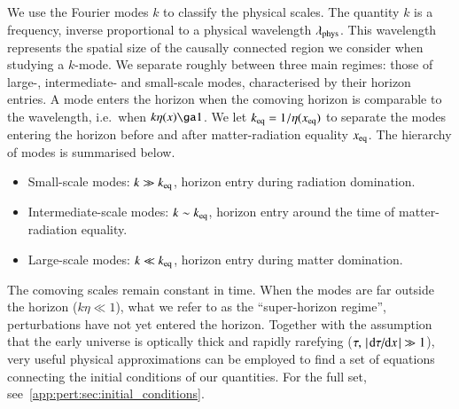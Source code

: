     We use the Fourier modes $k$ to classify the physical scales. The quantity $k$ is a frequency, inverse proportional to a physical wavelength $\lambda_\mathrm{phys}$. This wavelength represents the spatial size of the causally connected region we consider when studying a $k$-mode. We separate roughly between three main regimes: those of large-, intermediate- and small-scale modes, characterised by their horizon entries. A mode enters the horizon when the comoving horizon is comparable to the wavelength, i.e.\ when $k\eta(x) \ga 1$. We let $k_\mathrm{eq}= 1/\eta(x_\mathrm{eq})$ to separate the modes entering the horizon before and after matter-radiation equality $x_\mathrm{eq}$. The hierarchy of modes is summarised below.
    \begin{itemize}
        \item Small-scale modes: $k \gg k_\mathrm{eq}$, horizon entry during radiation domination.
        \item Intermediate-scale modes: $k \sim k_\mathrm{eq}$, horizon entry around the time of matter-radiation equality.
        \item Large-scale modes: $k \ll k_\mathrm{eq}$, horizon entry during matter domination.
    \end{itemize}

    The comoving scales remain constant in time. When the modes are far outside the horizon ($k\eta\ll 1$), what we refer to as the ``super-horizon regime'', perturbations have not yet entered the horizon. Together with the assumption that the early universe is optically thick and rapidly rarefying ($\tau,\, \abs{\dv*{\tau}{x}} \gg 1$), very useful physical approximations can be employed to find a set of equations connecting the initial conditions of our quantities. For the full set, see~\cref{app:pert:sec:initial_conditions}. 


